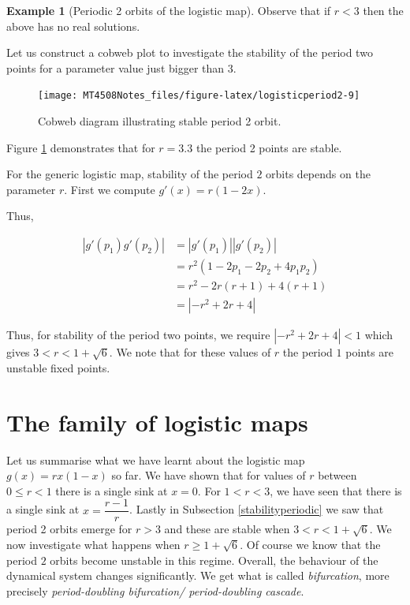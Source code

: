 \documentclass[
  a4paper,
  oneside,
  final]{krantz}
\theoremstyle{definition}
\theoremstyle{definition}
\newtheorem{example}{Example}[chapter]
\theoremstyle{definition}
\theoremstyle{definition}
\theoremstyle{remark}
\begin{document}
\begin{example}[Periodic 2 orbits of the logistic map]
Observe that if \(r<3\) then the above has no real solutions.

Let us construct a cobweb plot to investigate the stability of the period two points for a parameter value just bigger than \(3\).

\begin{figure}

{\centering \texttt{[image: MT4508Notes\_files/figure-latex/logisticperiod2-9]} 

}

\caption{Cobweb diagram illustrating stable period 2 orbit.}\label{fig:logisticperiod2}
\end{figure}

Figure \ref{fig:logisticperiod2} demonstrates that for \(r=3.3\) the period 2 points are stable.

For the generic logistic map, stability of the period \(2\) orbits depends on the parameter \(r\). First we compute \(g'(x) = r(1-2x)\).

Thus,

\begin{align*}
|g'(p_1)g'(p_2)| &= |g'(p_1)||g'(p_2)| \\
    &= r^2(1 - 2p_1 - 2p_2 + 4 p_1p_2) \\
    &= r^2 -2r(r+1) + 4(r+1) \\
    &= |-r^2 +2r + 4|
\end{align*}

Thus, for stability of the period two points, we require \(|-r^2 +2r + 4| <1\) which gives \(3 < r < 1 + \sqrt{6}\). We note that for these values of \(r\) the period \(1\) points are unstable fixed points.
\end{example}

\hypertarget{logisticfamily}{%
\section{The family of logistic maps}\label{logisticfamily}}

Let us summarise what we have learnt about the logistic map \(g(x) = rx(1-x)\) so far. We have shown that for values of \(r\) between \(0 \le r <1\) there is a single sink at \(x=0\). For \(1 < r < 3\), we have seen that there is a single sink at \(x = \dfrac{r-1}{r}\). Lastly in Subsection \ref{stabilityperiodic} we saw that period 2 orbits emerge for \(r >3\) and these are stable when \(3< r < 1+ \sqrt{6}\). We now investigate what happens when \(r \ge 1+ \sqrt{6}\). Of course we know that the period \(2\) orbits become unstable in this regime. Overall, the behaviour of the dynamical system changes significantly. We get what is called \emph{bifurcation}, more precisely \emph{period-doubling bifurcation/ period-doubling cascade}.
\end{document}
